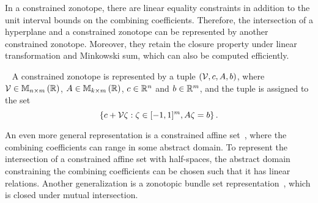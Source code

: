 In a constrained zonotope, there are linear equality constraints in
addition to the unit interval bounds on the combining coefficients.
Therefore, the intersection of a hyperplane and a constrained zonotope
can be represented by another constrained zonotope.  Moreover, they
retain the closure property under linear transformation and Minkowski
sum, which can also be computed efficiently.
%
\begin{definition}~\cite{scott2016constrained}
A constrained zonotope is represented by a tuple
$\left(\mathcal{V},c,A,b\right)$, where $\mathcal{V}\in\mathbb{M}_{n\times m}\left(\mathbb{R}\right)$,
$A\in\mathbb{M}_{k\times m}\left(\mathbb{R}\right)$, $c\in\mathbb{R}^n$ and $b\in\mathbb{R}^m$, and
the tuple is assigned to the set
%
\[\left\{c+\mathcal{V}\zeta:\zeta\in[-1,1]^m,A\zeta=b\right\}.\]
%
\end{definition}
%
An even more general representation is a constrained affine
set~\cite{Ghorbal2010}, where the combining coefficients can range in some
abstract domain.  To represent the intersection of a constrained affine
set with half-spaces, the abstract domain constraining the combining
coefficients can be chosen such that it has linear relations.  Another
generalization is a zonotopic bundle set representation~\cite{althoff2011zonotope},
which is closed under mutual intersection.


